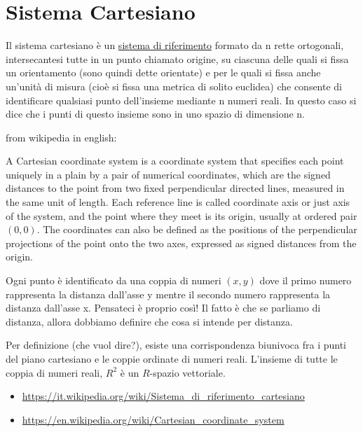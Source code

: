 \section{Sistema Cartesiano}
\begin{definizione}
Il sistema cartesiano \`{e} un \href{SistemaRiferimento.html}{sistema di riferimento} formato da n rette ortogonali, intersecantesi tutte in un punto
chiamato origine, su ciascuna delle quali si fissa un orientamento (sono quindi dette orientate) e per le quali si fissa
anche un'unità di misura (cioè si fissa una metrica di solito euclidea) che consente di identificare qualsiasi punto dell'insieme
mediante n numeri reali. In questo caso si dice che i punti di questo insieme sono in uno spazio di dimensione n.
\end{definizione}

\begin{definizione}
from wikipedia in english:
	
A Cartesian coordinate system is a coordinate system that specifies each point uniquely in a plain by a pair of numerical coordinates,
which are the signed distances to the point from two fixed perpendicular directed lines, measured in the same unit of length.
Each reference line is called coordinate axis or just axis of the system, and the point where they meet is its origin, usually at
ordered pair $(0, 0)$. The coordinates can also be defined as the positions of the perpendicular projections of the point onto the
two axes, expressed as signed distances from the origin.

\end{definizione}

\begin{osservazione}
Ogni punto è identificato da una coppia di numeri $(x,y)$ dove il primo numero rappresenta la distanza dall'asse y mentre il secondo
numero rappresenta la distanza dall'asse x. Pensateci è proprio così! Il fatto è che se parliamo di distanza, allora dobbiamo definire
che cosa si intende per distanza.

Per definizione (che vuol dire?), esiste una corrispondenza biunivoca fra i punti del piano cartesiano e le coppie ordinate di 
numeri reali. L'insieme di tutte le coppia di numeri reali, $R^2$ è un $R$-spazio vettoriale.

\end{osservazione}

\begin{osservazione}
\begin{itemize}
 \item \url{https://it.wikipedia.org/wiki/Sistema_di_riferimento_cartesiano}
 \item \url{https://en.wikipedia.org/wiki/Cartesian_coordinate_system}
\end{itemize}
\end{osservazione}


